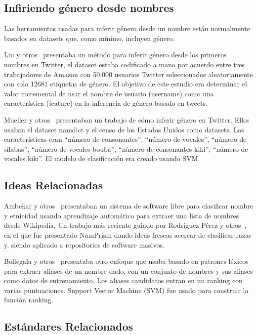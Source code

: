 \documentclass[a4paper]{article}
\begin{document}
\subsection{Infiriendo género desde nombres}

Las herramientas usadas para inferir género desde un nombre
están normalmente basados en datasets que, como mínimo, incluyen
género.

Liu y otros~\cite{liu2013s} presentaba un método para inferir
género desde los primeros nombres en Twitter, el dataset estaba
codificado a mano por acuerdo entre tres trabajadores de Amazon
con 50.000 usuarios Twitter seleccionados aleatoriamente con
solo 12681 etiquetas de género. El objetivo de este estudio
era determinar el valor incremental de usar el nombre de
usuario (username) como una característica (feature) en la
inferencia de género basado en tweets.

Mueller y otros~\cite{mueller2016gender} presentaban un trabajo
de cómo inferir género en Twitter. Ellos usaban el dataset
namdict y el censo de los Estados Unidos como datasets.
Las características eran ``número de consonantes'', ``número de
vocales'', ``número de sílabas'', ``número de vocales bouba'',
``número de consonantes kiki'', ``número de vocales kiki''. El
modelo de clasificación era creado usando SVM.

\subsection{Ideas Relacionadas}

Ambekar y otros~\cite{ambekar2009name} presentaban un sistema de
software libre para clasificar nombre y etnicidad usando aprendizaje
automático para extraer una lista de nombres desde Wikipedia.
Un trabajo más reciente guiado por Rodríguez Pérez y
otros~\cite{nadri2021relationship}, en el que fue presentado
NamPrism dando ideas frescas acercar de clasificar razas y,
siendo aplicado a repositorios de software masivos.

Bollegala y otros~\cite{bollegala2010automatic} presentaba otro
enfoque que usaba basado en patrones léxicos para extraer aliases
de un nombre dado, con un conjunto de nombres y sus aliases
como datos de entrenamiento. Los aliases candidatos entran en un
ranking con varias puntuaciones. Support Vector Machine (SVM)
fue usado para construir la función ranking.

\subsection{Estándares Relacionados}
\end{document}
